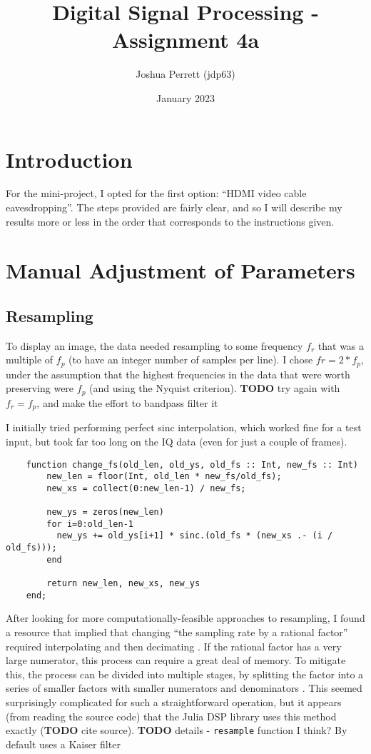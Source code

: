 \documentclass{article}
\title{Digital Signal Processing - Assignment 4a}
\author{Joshua Perrett (jdp63)}
\date{January 2023}
\newcommand*{\code}[1]{\texttt{#1}}
\newcommand*{\TODO}{\textbf{TODO}\xspace}
\begin{document}
\maketitle

\section*{Introduction}

For the mini-project, I opted for the first option: ``HDMI video cable eavesdropping''. The steps provided are fairly clear, and so I will describe my results more or less in the order that corresponds to the instructions given.

\section*{Manual Adjustment of Parameters}

\subsection*{Resampling}

To display an image, the data needed resampling to some frequency $f_r$ that was a multiple of $f_p$ (to have an integer number of samples per line). I chose $fr = 2 * f_p$, under the assumption that the highest frequencies in the data that were worth preserving were $f_p$ (and using the Nyquist criterion). \TODO try again with $f_r = f_p$, and make the effort to bandpass filter it

I initially tried performing perfect sinc interpolation, which worked fine for a test input, but took far too long on the IQ data (even for just a couple of frames).

\begin{verbatim}
    function change_fs(old_len, old_ys, old_fs :: Int, new_fs :: Int)
        new_len = floor(Int, old_len * new_fs/old_fs);
        new_xs = collect(0:new_len-1) / new_fs;

        new_ys = zeros(new_len)
        for i=0:old_len-1
          new_ys += old_ys[i+1] * sinc.(old_fs * (new_xs .- (i / old_fs)));
        end

        return new_len, new_xs, new_ys
    end;
\end{verbatim}


After looking for more computationally-feasible approaches to resampling, I found a resource that implied that changing ``the sampling rate by a rational factor'' required interpolating and then decimating \cite{dspguru-resampling}. If the rational factor has a very large numerator, this process can require a great deal of memory. To mitigate this, the process can be divided into multiple stages, by splitting the factor into a series of smaller factors with smaller numerators and denominators \cite{dspguru-resampling}. This seemed surprisingly complicated for such a straightforward operation, but it appears (from reading the source code) that the Julia DSP library uses this method exactly (\TODO cite source). \TODO details - \code{resample} function I think? By default uses a Kaiser filter
\end{document}
